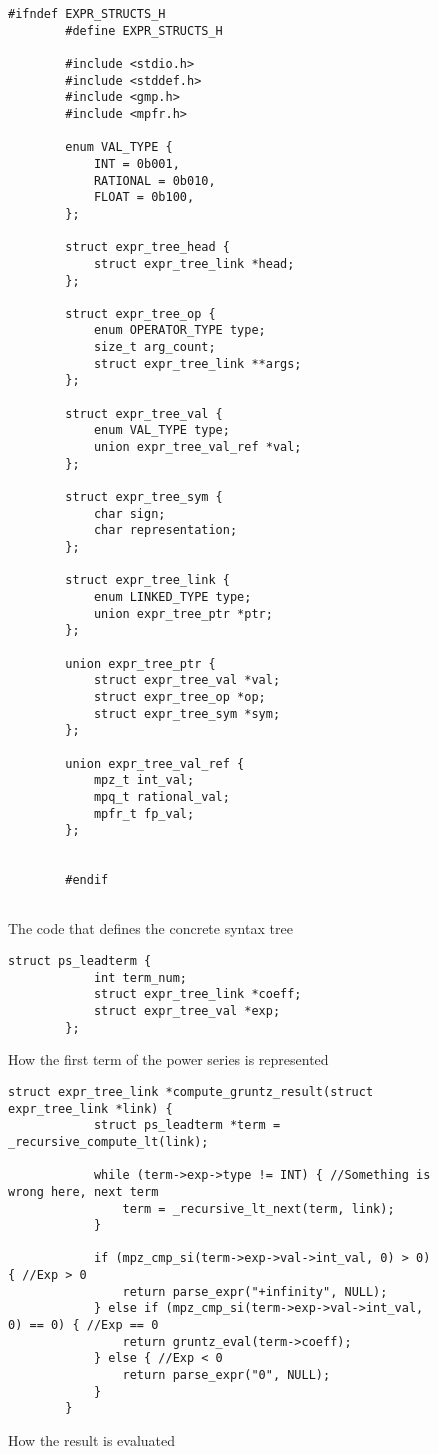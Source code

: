 \begin{figure}
	\centering
	\begin{lstlisting}[style=CStyle]
		#ifndef EXPR_STRUCTS_H
		#define EXPR_STRUCTS_H
		
		#include <stdio.h>
		#include <stddef.h>
		#include <gmp.h>
		#include <mpfr.h>
		
		enum VAL_TYPE {
			INT = 0b001,
			RATIONAL = 0b010,
			FLOAT = 0b100,
		};
		
		struct expr_tree_head {
			struct expr_tree_link *head;
		};
		
		struct expr_tree_op {
			enum OPERATOR_TYPE type;
			size_t arg_count;
			struct expr_tree_link **args;
		};
		
		struct expr_tree_val {
			enum VAL_TYPE type;
			union expr_tree_val_ref *val;
		};
		
		struct expr_tree_sym {
			char sign;
			char representation;
		};
		
		struct expr_tree_link {
			enum LINKED_TYPE type;
			union expr_tree_ptr *ptr;
		};
		
		union expr_tree_ptr {
			struct expr_tree_val *val;
			struct expr_tree_op *op;
			struct expr_tree_sym *sym;
		};
		
		union expr_tree_val_ref {
			mpz_t int_val;
			mpq_t rational_val;
			mpfr_t fp_val;
		};
		
		
		#endif
		
	\end{lstlisting}
	\caption{The code that defines the concrete syntax tree} \label{code:expr_structs}
\end{figure}

\begin{figure}
	\centering
	\begin{lstlisting}[style=CStyle]
		struct ps_leadterm {
			int term_num;
			struct expr_tree_link *coeff;
			struct expr_tree_val *exp;
		};
	\end{lstlisting}
	\caption{How the first term of the power series is represented} \label{code:ps_structs}
\end{figure}

\begin{figure}
	\centering
	\begin{lstlisting}[style=CStyle]
		struct expr_tree_link *compute_gruntz_result(struct expr_tree_link *link) {
			struct ps_leadterm *term = _recursive_compute_lt(link);
			
			while (term->exp->type != INT) { //Something is wrong here, next term
				term = _recursive_lt_next(term, link);
			}
		
			if (mpz_cmp_si(term->exp->val->int_val, 0) > 0) { //Exp > 0
				return parse_expr("+infinity", NULL);
			} else if (mpz_cmp_si(term->exp->val->int_val, 0) == 0) { //Exp == 0
				return gruntz_eval(term->coeff);
			} else { //Exp < 0
				return parse_expr("0", NULL);
			}
		}
	\end{lstlisting}
	\caption{How the result is evaluated} \label{code:ps_result}
\end{figure}

